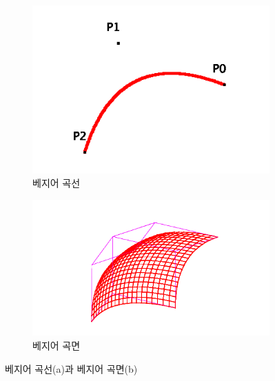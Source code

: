 \documentclass{gshs_thesis}
\theoremstyle{theorem}
\theoremstyle{lemma}
\theoremstyle{definition}
\begin{document}
\begin{figure}[h]
	\centering
	\begin{subfigure}[b]{.45\textwidth}
		\centering
		\includegraphics[width=\textwidth]{image/BC}
		\caption{베지어 곡선}
	\end{subfigure}
	\hfill
	\begin{subfigure}[b]{.45\textwidth}
		\centering
		\includegraphics[width=\textwidth]{image/BS}
		\caption{베지어 곡면}
	\end{subfigure}
	\caption{베지어 곡선(a)과 베지어 곡면(b)}
\end{figure}
\end{document}
